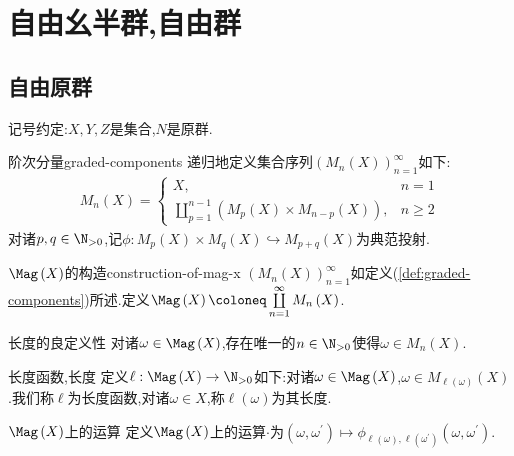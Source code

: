 \chapter{自由幺半群,自由群}

\section{自由原群}

记号约定:$X,Y,Z$是集合,$N$是原群.

\begin{definition}{阶次分量}{graded-components}
	递归地定义集合序列$\left(M_{n}\left(X\right)\right)_{n=1}^{\infty}$如下:
	\begin{align}
		M_{n}\left(X\right)=
		\begin{cases}
			X,&n=1\\
			\coprod\limits_{p=1}^{n-1}\left(M_{p}\left(X\right)\times M_{n-p}\left(X\right)\right),&n\geq 2
		\end{cases}
	\end{align}
	对诸$p,q\in\N_{>0}$,记$\phi:M_{p}\left(X\right)\times M_{q}\left(X\right)\hookrightarrow M_{p+q}\left(X\right)$为典范投射.
\end{definition}

\begin{definition}{$\Mag\left(X\right)$的构造}{construction-of-mag-x}
	$\left(M_{n}\left(X\right)\right)_{n=1}^{\infty}$如定义(\ref{def:graded-components})所述.定义$\Mag\left(X\right)\coloneq\coprod\limits_{n=1}^{\infty}M_{n}\left(X\right)$.
\end{definition}

\begin{proposition}{长度的良定义性}{}
	对诸$\omega\in\Mag\left(X\right)$,存在唯一的$n\in\N_{>0}$使得$\omega\in M_{n}\left(X\right)$.
\end{proposition}

\begin{definition}{长度函数,长度}{}
	定义$\ell:\Mag\left(X\right)\to\N_{>0}$如下:对诸$\omega\in\Mag\left(X\right)$,$\omega\in M_{\ell\left(\omega\right)}\left(X\right)$.我们称$\ell$为长度函数,对诸$\omega\in X$,称$\ell\left(\omega\right)$为其长度.
\end{definition}

\begin{definition}{$\Mag\left(X\right)$上的运算}{}
	定义$\Mag\left(X\right)$上的运算$\cdot$为$\left(\omega,\omega^{\prime}\right)\mapsto\phi_{\ell\left(\omega\right),\ell\left(\omega^{\prime}\right)}\left(\omega,\omega^{\prime}\right)$.
\end{definition}

